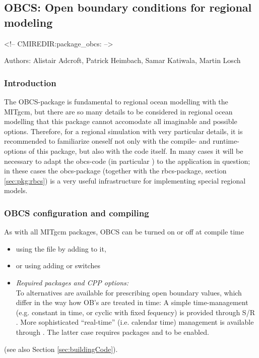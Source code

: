 \subsection{OBCS: Open boundary conditions for regional modeling}

\label{sec:pkg:obcs}
\begin{rawhtml}
<!-- CMIREDIR:package_obcs: -->
\end{rawhtml}

Authors: 
Alistair Adcroft, Patrick Heimbach, Samar Katiwala, Martin Losch

\subsubsection{Introduction
\label{sec:pkg:obcs:intro}}

The OBCS-package is fundamental to regional ocean modelling with the
MITgcm, but there are so many details to be considered in
regional ocean modelling that this package cannot accomodate all
imaginable and possible options. Therefore, for a regional simulation
with very particular details, it is recommended to familiarize oneself
not only with the compile- and runtime-options of this package, but
also with the code itself. In many cases it will be necessary to adapt
the obcs-code (in particular ) to the application
in question; in these cases the obcs-package (together with the
rbcs-package, section \ref{sec:pkg:rbcs}) is a very
useful infrastructure for implementing special regional models.


\subsubsection{OBCS configuration and compiling
\label{sec:pkg:obcs:comp}}

As with all MITgcm packages, OBCS can be turned on or off 
at compile time
%
\begin{itemize}
%
\item
using the  file by adding  to it,
%
\item
or using  adding
 or  switches
%
\item
\textit{Required packages and CPP options:} \\
%
To alternatives are available for prescribing open boundary values,
which differ in the way how OB's are treated in time:
A simple time-management (e.g. constant in time, or cyclic with
fixed fequency) is provided through 
S/R .
More sophisticated ``real-time'' (i.e. calendar time) management is
available through . 
The latter case requires
packages  and  to be enabled.
%
\end{itemize}
(see also Section \ref{sec:buildingCode}).

